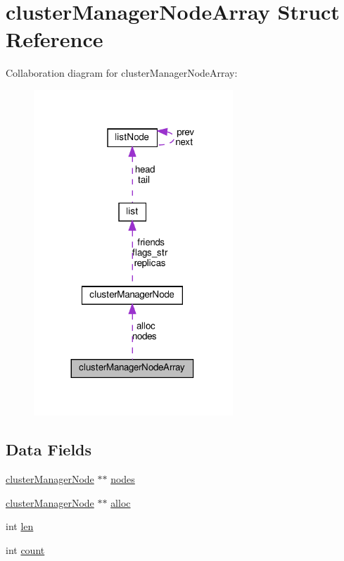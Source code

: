 \hypertarget{structcluster_manager_node_array}{}\section{cluster\+Manager\+Node\+Array Struct Reference}
\label{structcluster_manager_node_array}


Collaboration diagram for cluster\+Manager\+Node\+Array\+:
\nopagebreak
\begin{figure}[H]
\begin{center}
\leavevmode
\includegraphics[width=212pt]{structcluster_manager_node_array__coll__graph}
\end{center}
\end{figure}
\subsection*{Data Fields}
\begin{DoxyCompactItemize}
\item 
\hyperlink{structcluster_manager_node}{cluster\+Manager\+Node} $\ast$$\ast$ \hyperlink{structcluster_manager_node_array_ac096916b9ab293648d96462d59ae6d7d}{nodes}
\item 
\hyperlink{structcluster_manager_node}{cluster\+Manager\+Node} $\ast$$\ast$ \hyperlink{structcluster_manager_node_array_ab2efecb0fc6faf2a39de0b80b9028483}{alloc}
\item 
int \hyperlink{structcluster_manager_node_array_afed088663f8704004425cdae2120b9b3}{len}
\item 
int \hyperlink{structcluster_manager_node_array_ad43c3812e6d13e0518d9f8b8f463ffcf}{count}
\end{DoxyCompactItemize}


